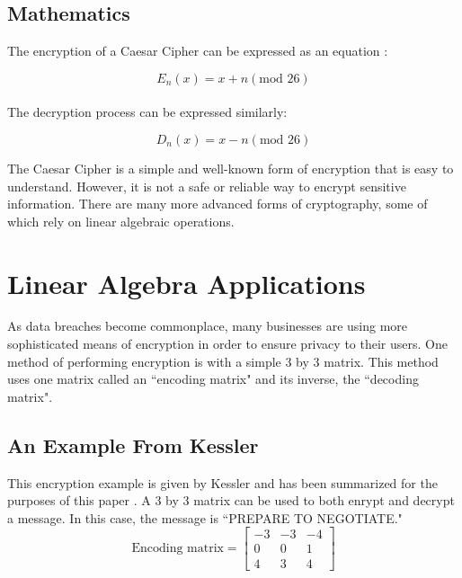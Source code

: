 \documentclass{article}
\begin{document}
\subsection{Mathematics}
The encryption of a Caesar Cipher can be expressed as an equation \cite{ref3:3}:

$$ E_{n}(x) = x + n  (\text{mod }26)$$\\
The decryption process can be expressed similarly:

$$ D_{n}(x) = x - n  (\text{mod }26)$$

\noindent
The Caesar Cipher is a simple and well-known form of encryption that is easy to understand. However, it is not a safe or reliable way to encrypt sensitive information. There are many more advanced forms of cryptography, some of which rely on linear algebraic operations.

\section{Linear Algebra Applications}
As data breaches become commonplace, many businesses are using more sophisticated means of encryption in order to ensure privacy to their users. One method of performing encryption is with a simple 3 by 3 matrix. This method uses one matrix called an ``encoding matrix" and its inverse, the ``decoding matrix"\cite{ref4:4}.

\subsection{An Example From Kessler}
This encryption example is given by Kessler and has been summarized for the purposes of this paper \cite{ref2:2}. A 3 by 3 matrix can be used to both enrypt and decrypt a message. In this case, the message is ``PREPARE TO NEGOTIATE."
$$\text{Encoding matrix}=
\begin{bmatrix}
-3 & -3 & -4 \\
0 & 0 & 1 \\
4 & 3 & 4 
\end{bmatrix}
$$
\end{document}
